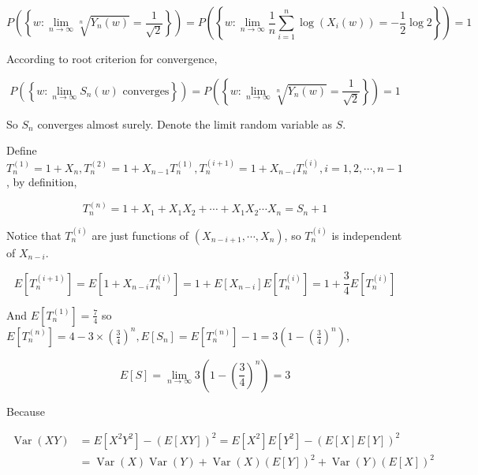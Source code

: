 \documentclass{article}
\begin{document}
\begin{equation}
    P\left(\left\{w:\lim_{n\to \infty} \sqrt[n]{Y_n(w)} = \frac{1}{\sqrt{2}}\right\}\right) = P\left(\left\{w:\lim_{n\to \infty} \frac{1}{n}\sum_{i=1}^n \log (X_i(w))=-\frac{1}{2} \log2\right\}\right) = 1
\end{equation}

According to root criterion for convergence,

\begin{equation}
    P\left(\left\{w:\lim_{n\to \infty} S_n(w) \text{ converges} \right\}\right) = P\left(\left\{w:\lim_{n\to \infty} \sqrt[n]{Y_n(w)} = \frac{1}{\sqrt{2}}\right\}\right) = 1
\end{equation}

So $S_n$ converges almost surely. Denote the limit random variable as $S$.


Define $T_n^{(1)} = 1 + X_n,T_n^{(2)} = 1+ X_{n-1}T_n^{(1)},T_n^{(i+1)} = 1+ X_{n-i}T_n^{(i)}, i =1,2,\cdots,n-1$, by definition,

\begin{equation}
    T_n^{(n)} = 1+ X_1 + X_1X_2 + \cdots + X_1X_2\cdots X_n = S_n +1 
\end{equation}

Notice that $T_n^{(i)}$ are just functions of $(X_{n-i+1},\cdots,X_n)$, so $T_n^{(i)}$ is independent of $X_{n-i}$.

\begin{equation}
    E[T_n^{(i+1)}] = E[1+ X_{n-i}T_n^{(i)}] = 1 + E[X_{n-i}] E[T_n^{(i)}] =  1+ \frac{3}{4} E[T_n^{(i)}]
\end{equation}

And $E[T_n^{(1)}] = \frac{7}{4}$ so $E[T_n^{(n)}] = 4 - 3 \times (\frac{3}{4})^n, E[S_n] = E[T_n^{(n)}] - 1 = 3(1-(\frac{3}{4})^n)$,


\begin{equation}
    E[S] = \lim_{n \to \infty}  3(1-(\frac{3}{4})^n) = 3
\end{equation}


Because

\begin{equation}
    \begin{aligned}
        \operatorname{Var}(XY) & = E[X^2Y^2] - (E[XY])^2= E[X^2] E[Y^2] - (E[X]E[Y])^2 \\
        & = \operatorname{Var}(X)\operatorname{Var}(Y) + \operatorname{Var}(X) (E[Y])^2  +  \operatorname{Var}(Y) (E[X])^2 
    \end{aligned}
\end{equation}
\end{document}
